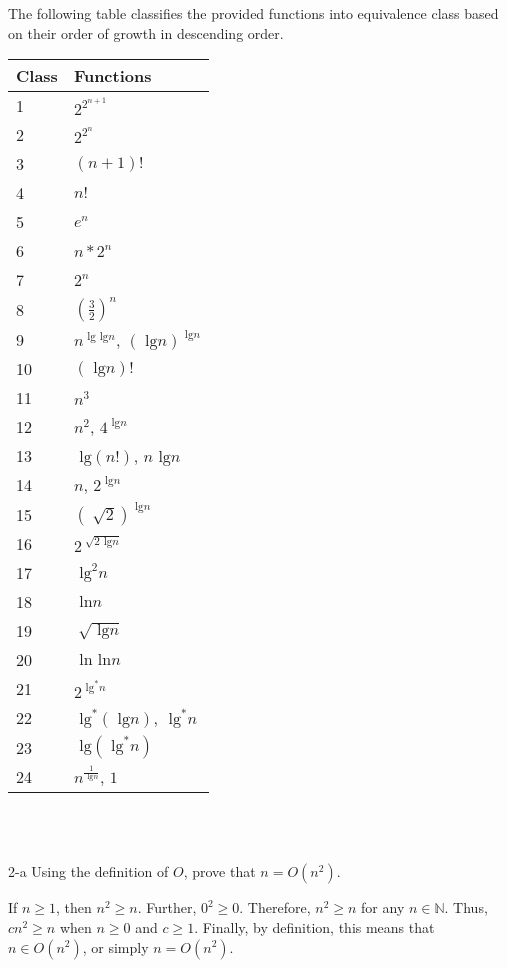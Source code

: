 \documentclass[11pt]{article}
\newcommand{\tlg}{\text{ lg}}
\newcommand{\tln}{\text{ ln}}
\begin{document}
\begin{prob}{1}
\end{prob}
\begin{sol} 

The following table classifies the provided functions into equivalence class based on their order of growth in descending order.  \\

\begin{tabular}{|l|l|}
	\hline
	\textbf{Class} & \textbf{Functions} \\
	\hline 
	1 & $2^{2^{n+1}}$ \\
	2 & $2^{2^{n}}$ \\
	3 & $(n+1)!$ \\
	4 & $n!$ \\
	5 & $e^{n}$ \\
	6 & $n * 2^{n}$ \\
	7 & $2^{n} $ \\
	8 & $(\frac{3}{2})^{n}$ \\ 
	9 & $n^{\tlg \tlg n}$, $(\tlg n)^{\tlg n}$ \\
	10 & $(\tlg n)!$ \\
	11 & $n^{3}$ \\
	12 & $n^{2}$, $4^{\tlg n}$ \\
	13 & $\tlg(n!)$, $n \tlg n$ \\
	14 & $n$, $2^{\tlg n}$ \\
	15 & $(\sqrt[]{2})^{\tlg n}$ \\
	16 & $2^{\sqrt[]{2\tlg n}}$ \\
	17 & $\tlg^{2}n$ \\
	18 & $\tln n$ \\
	19 & $\sqrt[]{\tlg n}$ \\
	20 & $\tln \tln n$ \\
	21 & $2^{\tlg^{*}n}$ \\
	22 & $\tlg^{*}(\tlg n)$, $\tlg^{*}n$ \\
	23 & $\tlg(\tlg^{*}n)$ \\
	24 & $n^{\frac{1}{\tlg n}}$, $1$ \\
	\hline
\end{tabular} \\ \\
\end{sol}

\begin{prob}{2-a}
Using the definition of $O$, prove that $n = O(n^{2})$.
\end{prob}
\begin{sol} 
If $n \geq 1$, then $n^{2} \geq n$. Further, $0^{2} \geq 0$. Therefore, $n^{2} \geq n$ for any $n \in \mathbb{N}$. Thus, $cn^{2} \geq n$ when $n \geq 0$ and $c \geq 1$. Finally, by definition, this means that $n \in O(n^{2})$, or simply $n = O(n^{2})$.
\end{sol}
\end{document}
